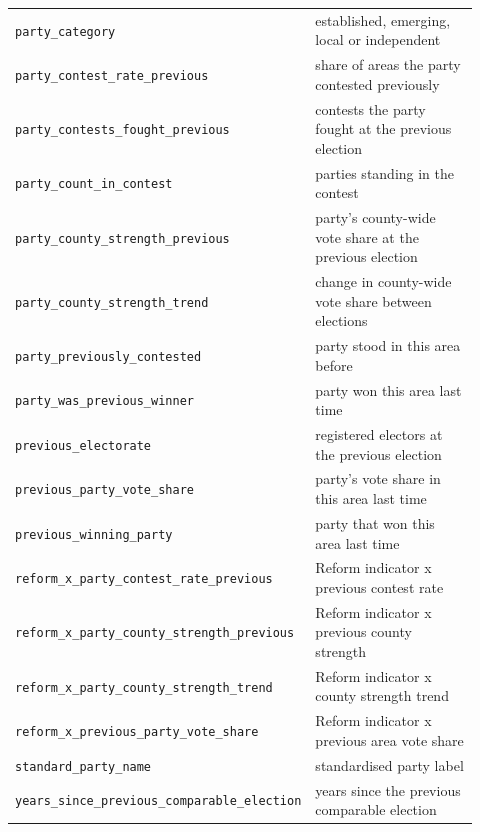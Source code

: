 \begin{tabular}{p{0.42\linewidth}p{0.50\linewidth}}
\texttt{party\_\allowbreak{}category} & established, emerging, local or independent \\
\texttt{party\_\allowbreak{}contest\_\allowbreak{}rate\_\allowbreak{}previous} & share of areas the party contested previously \\
\texttt{party\_\allowbreak{}contests\_\allowbreak{}fought\_\allowbreak{}previous} & contests the party fought at the previous election \\
\texttt{party\_\allowbreak{}count\_\allowbreak{}in\_\allowbreak{}contest} & parties standing in the contest \\
\texttt{party\_\allowbreak{}county\_\allowbreak{}strength\_\allowbreak{}previous} & party's county-wide vote share at the previous election \\
\texttt{party\_\allowbreak{}county\_\allowbreak{}strength\_\allowbreak{}trend} & change in county-wide vote share between elections \\
\texttt{party\_\allowbreak{}previously\_\allowbreak{}contested} & party stood in this area before \\
\texttt{party\_\allowbreak{}was\_\allowbreak{}previous\_\allowbreak{}winner} & party won this area last time \\
\texttt{previous\_\allowbreak{}electorate} & registered electors at the previous election \\
\texttt{previous\_\allowbreak{}party\_\allowbreak{}vote\_\allowbreak{}share} & party's vote share in this area last time \\
\texttt{previous\_\allowbreak{}winning\_\allowbreak{}party} & party that won this area last time \\
\texttt{reform\_\allowbreak{}x\_\allowbreak{}party\_\allowbreak{}contest\_\allowbreak{}rate\_\allowbreak{}previous} & Reform indicator x previous contest rate \\
\texttt{reform\_\allowbreak{}x\_\allowbreak{}party\_\allowbreak{}county\_\allowbreak{}strength\_\allowbreak{}previous} & Reform indicator x previous county strength \\
\texttt{reform\_\allowbreak{}x\_\allowbreak{}party\_\allowbreak{}county\_\allowbreak{}strength\_\allowbreak{}trend} & Reform indicator x county strength trend \\
\texttt{reform\_\allowbreak{}x\_\allowbreak{}previous\_\allowbreak{}party\_\allowbreak{}vote\_\allowbreak{}share} & Reform indicator x previous area vote share \\
\texttt{standard\_\allowbreak{}party\_\allowbreak{}name} & standardised party label \\
\texttt{years\_\allowbreak{}since\_\allowbreak{}previous\_\allowbreak{}comparable\_\allowbreak{}election} & years since the previous comparable election \\
\bottomrule
\end{tabular}
